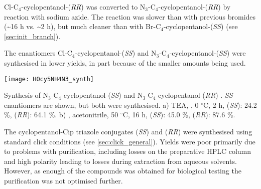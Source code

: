 %


Cl-C$_4$-cyclopentanol-(\textit{RR})  was converted to N$_3$-C$_4$-cyclopentanol-(\textit{RR})  by reaction with sodium azide. The reaction was slower than with previous bromides (\textasciitilde16 h vs. \textasciitilde2 h), but much cleaner than with Br-C$_4$-cyclopentanol-(\textit{SS})  (see \ref{sec:init_branch}).

The enantiomers Cl-C$_4$-cyclopentanol-(\textit{SS})  and N$_3$-C$_4$-cyclopentanol-(\textit{SS})  were synthesised in lower yields, in part because of the smaller amounts being used.

\begin{scheme}[H]
	\begin{center}
		\texttt{[image: HOcy5NH4N3\_synth]}
		\caption{Synthesis of N$_3$-C$_4$-cyclopentanol-(\textit{SS})  and N$_3$-C$_4$-cyclopentanol-(\textit{RR}) . 
		\textit{SS} enantiomers are shown, but both were synthesised.
		a) TEA, , 0 $^{\circ}$C, 2 h,
		 (\textit{SS}): 24.2 \%, 
		 (\textit{RR}): 64.1 \%.
		b) , acetonitrile, 50 $^\circ$C, 16 h, 
		 (\textit{SS}): 45.0 \%, 
		 (\textit{RR}): 87.6 \%.
		\label{sch:HOcy5NH4N3_synth}}
	\end{center}
\end{scheme}

The cyclopentanol-Cip triazole conjugates  (\textit{SS}) and  (\textit{RR}) were synthesised using standard click conditions (see \ref{sec:click_general}). Yields were poor primarily due to problems with purification, including losses on the preparative HPLC column and high polarity leading to losses during extraction from aqueous solvents. However, as enough of the compounds was obtained for biological testing the purification was not optimised further.

